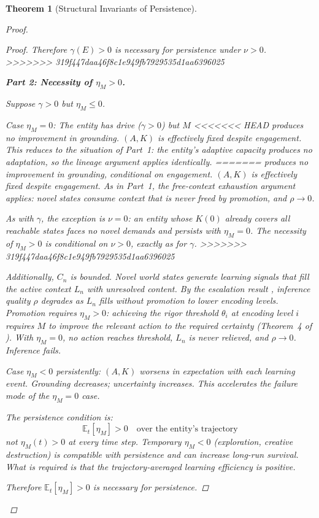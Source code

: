 \documentclass[11pt]{article}
\newtheorem{theorem}{Theorem}
\theoremstyle{definition}
\theoremstyle{remark}
\begin{document}
\begin{theorem}[Structural Invariants of Persistence]
\begin{proof}
\begin{proof}
Therefore $\gamma(E) > 0$ is necessary for persistence under $\nu > 0$.
>>>>>>> 319f447daa46f8c1e949fb7929535d1aa6396025

\medskip
\textbf{Part 2: Necessity of $\eta_M > 0$.}

Suppose $\gamma > 0$ but $\eta_M \leq 0$.

\emph{Case $\eta_M = 0$}: The entity has drive ($\gamma > 0$) but $M$
<<<<<<< HEAD
produces no improvement in grounding. $(A, K)$ is effectively fixed
despite engagement. This reduces to the situation of Part~1: the
entity's adaptive capacity produces no adaptation, so the lineage
argument applies identically.
=======
produces no improvement in grounding, conditional on engagement.
$(A, K)$ is effectively fixed despite engagement. As in Part~1,
the free-context exhaustion argument applies: novel states consume
context that is never freed by promotion, and $\rho \to 0$.

As with $\gamma$, the exception is $\nu = 0$: an entity whose $K(0)$
already covers all reachable states faces no novel demands and persists
with $\eta_M = 0$. The necessity of $\eta_M > 0$ is conditional on
$\nu > 0$, exactly as for $\gamma$.
>>>>>>> 319f447daa46f8c1e949fb7929535d1aa6396025

Additionally, $C_n$ is bounded. Novel world states generate learning
signals that fill the active context $L_n$ with unresolved content. By
the escalation result \cite{McCarthy2026b}, inference quality $\rho$
degrades as $L_n$ fills without promotion to lower encoding levels.
Promotion requires $\eta_M > 0$: achieving the rigor threshold
$\theta_i$ at encoding level $i$ requires $M$ to improve the relevant
action to the required certainty (Theorem~4 of \cite{McCarthy2026d}).
With $\eta_M = 0$, no action reaches threshold, $L_n$ is never
relieved, and $\rho \to 0$. Inference fails.

\emph{Case $\eta_M < 0$ persistently}: $(A, K)$ worsens in expectation
with each learning event. Grounding decreases; uncertainty increases.
This accelerates the failure mode of the $\eta_M = 0$ case.

The persistence condition is:
\[
\mathbb{E}_t[\eta_M] > 0 \quad \text{over the entity's trajectory}
\]
not $\eta_M(t) > 0$ at every time step. Temporary $\eta_M < 0$
(exploration, creative destruction) is compatible with persistence and
can increase long-run survival. What is required is that the
trajectory-averaged learning efficiency is positive.

Therefore $\mathbb{E}_t[\eta_M] > 0$ is necessary for persistence.


\end{proof}
\end{proof}
\end{theorem}
\end{document}
